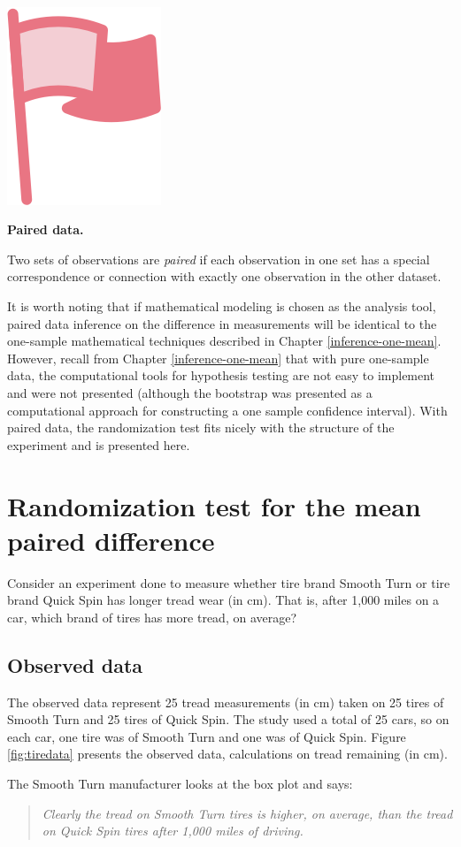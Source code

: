 \documentclass[
  10pt,
  openany]{book}
\newenvironment{mdframedwithfootImportant}
{   
    \savenotes
    \begin{mdframed}[%
    topline=true, bottomline=true, linecolor=oiR, linewidth=0.5pt,
    rightline=false, leftline=false,
    backgroundcolor=oiLGray]
    \renewcommand{\thempfootnote}{\arabic{footnote}}
    }
{
    \end{mdframed}
    \spewnotes
}
\newenvironment{important}{
    \let\oldtextbf\textbf
    \renewcommand{\textbf}[1]{{\textcolor{oiR}{\oldtextbf{##1}}}}
\vspace{4mm}
\begin{mdframedwithfootImportant}
\begin{minipage}[t]{0.10\textwidth}
{$\:$ \\ \setkeys{Gin}{width=2.5em,keepaspectratio}\includegraphics{images/_icons/important.png}}
\end{minipage}
\hfill
\begin{minipage}[t]{0.90\textwidth}
\vspace{-2mm}
\setlength{\parskip}{1em}
}{\end{minipage}
\end{mdframedwithfootImportant}
\vspace{4mm}
}
\begin{document}
\begin{important}
\textbf{Paired data.}

Two sets of observations are \emph{paired} if each observation in one set has a special correspondence or connection with exactly one observation in the other dataset.

\end{important}

It is worth noting that if mathematical modeling is chosen as the analysis tool, paired data inference on the difference in measurements will be identical to the one-sample mathematical techniques described in Chapter \ref{inference-one-mean}.
However, recall from Chapter \ref{inference-one-mean} that with pure one-sample data, the computational tools for hypothesis testing are not easy to implement and were not presented (although the bootstrap was presented as a computational approach for constructing a one sample confidence interval).
With paired data, the randomization test fits nicely with the structure of the experiment and is presented here.

\hypertarget{randomization-test-for-the-mean-paired-difference}{%
\section{Randomization test for the mean paired difference}\label{randomization-test-for-the-mean-paired-difference}}

Consider an experiment done to measure whether tire brand Smooth Turn or tire brand Quick Spin has longer tread wear (in cm).
That is, after 1,000 miles on a car, which brand of tires has more tread, on average?

\hypertarget{observed-data-15}{%
\subsection{Observed data}\label{observed-data-15}}

The observed data represent 25 tread measurements (in cm) taken on 25 tires of Smooth Turn and 25 tires of Quick Spin.
The study used a total of 25 cars, so on each car, one tire was of Smooth Turn and one was of Quick Spin.
Figure \ref{fig:tiredata} presents the observed data, calculations on tread remaining (in cm).

The Smooth Turn manufacturer looks at the box plot and says:

\begin{quote}
\emph{Clearly the tread on Smooth Turn tires is higher, on average, than the tread on Quick Spin tires after 1,000 miles of driving.}
\end{quote}
\end{document}
